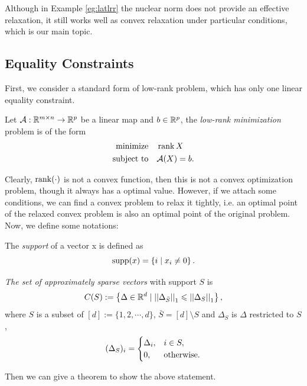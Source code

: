 \documentclass[11pt]{article}
\begin{document}
Although in Example \ref{eg:latlrr} the nuclear norm does not provide an effective relaxation, it still works well as convex relaxation under particular conditions, which is our main topic.

\subsection{Equality Constraints}

First, we consider a standard form of low-rank problem, which has only one linear equality constraint.
\begin{definition}\label{def:lowrank}
    Let \(\mathcal{A}:\mathbb R^{m\times n}\to \mathbb R^p\) be a linear map and \(b\in \mathbb R^p\), the \emph{low-rank minimization} problem is of the form 
    \[\begin{aligned}
        \textnormal{minimize}\quad & \operatorname{rank} X\\
        \textnormal{subject to}\quad & \mathcal A(X)=b.
    \end{aligned}\]
\end{definition}

Clearly, \(\operatorname{rank}(\cdot)\) is not a convex function, then this is not a convex optimization problem, though it always has a optimal value. However, if we attach some conditions, we can find a convex problem to relax it tightly, i.e. an optimal point of the relaxed convex problem is also an optimal point of the original problem. Now, we define some notations:

\begin{definition}[Support]
    The \emph{support} of a vector x is defined as
    \[\operatorname{supp}(x) = \left\{i \mid x_i \neq 0\right\}.\]
\end{definition}

\begin{definition}
    \emph{The set of approximately sparse vectors} with support \(S\) is 
    \[C(S):=\left\{\Delta \in \mathbb R^d \mid \left|\left|\Delta_{\bar{S}}\right|\right|_1\leqslant \left|\left|\Delta_S\right|\right|_1\right\},\]
    where \(S\) is a subset of \([d]:=\{1,2,\cdots,d\}\), \(\bar{S}=[d]\setminus S\) and \(\Delta_S\) is \(\Delta\) restricted to \(S\),
    \[(\Delta_S)_i = \begin{cases}
        \Delta_i, & i \in S,\\
        0, & \textnormal{otherwise}.
    \end{cases}\]
\end{definition}

Then we can give a theorem to show the above statement.
\end{document}

